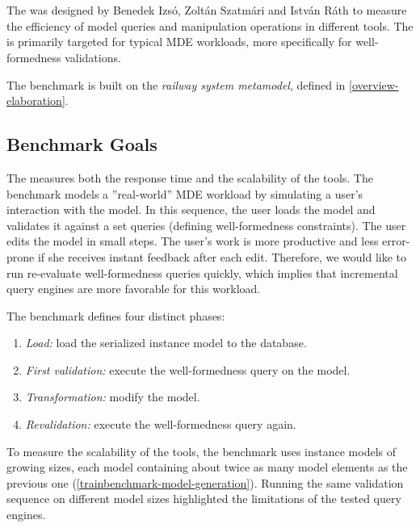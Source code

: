 \section{\tb{}}
\label{trainbenchmark}

The \tb{} was designed by Benedek Izsó, Zoltán Szatmári and István Ráth \cite{high-performance-queries} to measure the efficiency of model queries and manipulation operations in different tools. The \tb{} is primarily targeted for typical MDE workloads, more specifically for well-formedness validations.

The benchmark is built on the \emph{railway system metamodel}, defined in \autoref{overview-elaboration}.

\subsection{Benchmark Goals}

The \tb{} measures both the response time and the scalability of the tools. The benchmark models a ''real-world'' MDE workload by simulating a user's interaction with the model. In this sequence, the user loads the model and validates it against a set  queries (defining well-formedness constraints). The user edits the model in small steps. The user's work is more productive and less error-prone if she receives instant feedback after each edit. Therefore, we would like to run re-evaluate well-formedness queries quickly, which implies that incremental query engines are more favorable for this workload.

The benchmark defines four distinct phases:

\begin{enumerate}
  \item \emph{Load:} load the serialized instance model to the database.
  \item \emph{First validation:} execute the well-formedness query on the model.
  \item \emph{Transformation:} modify the model.
  \item \emph{Revalidation:} execute the well-formedness query again.
\end{enumerate}

To measure the scalability of the tools, the benchmark uses instance models of growing sizes, each model containing about twice as many model elements as the previous one (\autoref{trainbenchmark-model-generation}). Running the same validation sequence on different model sizes highlighted the limitations of the tested query engines.

